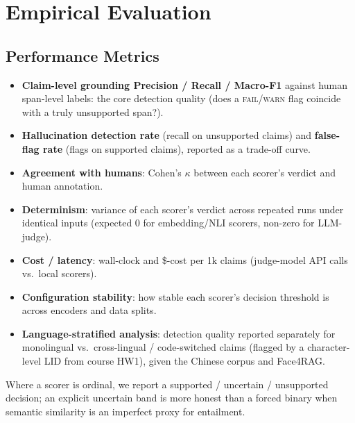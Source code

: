 \section{Empirical Evaluation}
\label{section:evaluation}

\subsection{Performance Metrics}
\begin{itemize}
  \item \textbf{Claim-level grounding Precision / Recall / Macro-F1} against human
  span-level labels: the core detection quality (does a \textsc{fail}/\textsc{warn}
  flag coincide with a truly unsupported span?).
  \item \textbf{Hallucination detection rate} (recall on unsupported claims) and
  \textbf{false-flag rate} (flags on supported claims), reported as a trade-off curve.
  \item \textbf{Agreement with humans}: Cohen's $\kappa$ between each scorer's verdict and
  human annotation.
  \item \textbf{Determinism}: variance of each scorer's verdict across repeated runs under
  identical inputs (expected $0$ for embedding/NLI scorers, non-zero for LLM-judge).
  \item \textbf{Cost / latency}: wall-clock and \$-cost per 1k claims (judge-model API
  calls vs.\ local scorers).
  \item \textbf{Configuration stability}: how stable each scorer's decision threshold is
  across encoders and data splits.
  \item \textbf{Language-stratified analysis}: detection quality reported separately for
  monolingual vs.\ cross-lingual / code-switched claims (flagged by a character-level LID
  from course HW1), given the Chinese corpus and Face4RAG.
\end{itemize}
Where a scorer is ordinal, we report a supported / uncertain / unsupported decision; an
explicit uncertain band is more honest than a forced binary when semantic similarity is an
imperfect proxy for entailment.

